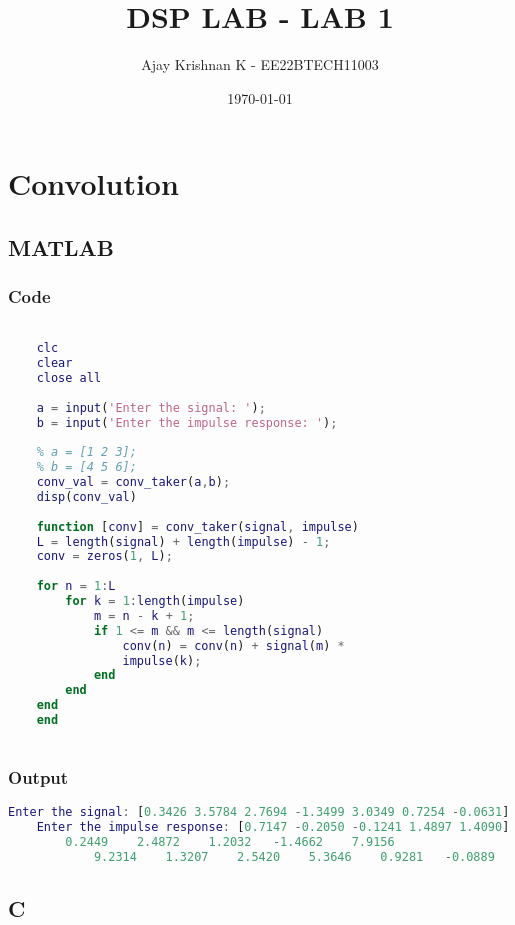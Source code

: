 \documentclass{article}
\title{DSP LAB - LAB 1}
\author{Ajay Krishnan K - EE22BTECH11003}
\date{\today}
\begin{document}
\maketitle

\section{Convolution}
\subsection{MATLAB}
\subsubsection{Code}
\begin{lstlisting}[language=Matlab]
    % CONVOLUTION

    clc
    clear
    close all
    
    a = input('Enter the signal: ');
    b = input('Enter the impulse response: ');
    
    % a = [1 2 3];
    % b = [4 5 6];
    conv_val = conv_taker(a,b);
    disp(conv_val)
    
    function [conv] = conv_taker(signal, impulse)
    L = length(signal) + length(impulse) - 1;
    conv = zeros(1, L);
    
    for n = 1:L
        for k = 1:length(impulse)
            m = n - k + 1;
            if 1 <= m && m <= length(signal)
                conv(n) = conv(n) + signal(m) * 
                impulse(k);
            end
        end
    end
    end
    
\end{lstlisting}

\subsubsection{Output}
\begin{lstlisting}[language=Matlab]
    Enter the signal: [0.3426 3.5784 2.7694 -1.3499 3.0349 0.7254 -0.0631]
    Enter the impulse response: [0.7147 -0.2050 -0.1241 1.4897 1.4090]
        0.2449    2.4872    1.2032   -1.4662    7.9156    
            9.2314    1.3207    2.5420    5.3646    0.9281   -0.0889
\end{lstlisting}

\subsection{C}
\end{document}
